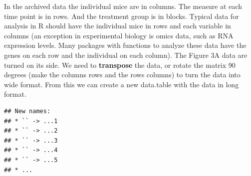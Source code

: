 \documentclass[]{book}
\newenvironment{Shaded}{\begin{snugshade}}{\end{snugshade}}
\newcommand{\DataTypeTok}[1]{\textcolor[rgb]{0.13,0.29,0.53}{#1}}
\newcommand{\KeywordTok}[1]{\textcolor[rgb]{0.13,0.29,0.53}{\textbf{#1}}}
\newcommand{\NormalTok}[1]{#1}
\newcommand{\OperatorTok}[1]{\textcolor[rgb]{0.81,0.36,0.00}{\textbf{#1}}}
\newcommand{\OtherTok}[1]{\textcolor[rgb]{0.56,0.35,0.01}{#1}}
\newcommand{\StringTok}[1]{\textcolor[rgb]{0.31,0.60,0.02}{#1}}
\begin{document}
In the archived data the individual mice are in columns. The measure at each time point is in rows. And the treatment group is in blocks. Typical data for analysis in R should have the individual mice in rows and each variable in columns (an exception in experimental biology is omics data, such as RNA expression levels. Many packages with functions to analyze these data have the genes on each row and the individual on each column). The Figure 3A data are turned on its side. We need to \textbf{transpose} the data, or rotate the matrix 90 degrees (make the columns rows and the rows columns) to turn the data into wide format. From this we can create a new data.table with the data in long format.

\begin{Shaded}
\end{Shaded}

\begin{verbatim}
## New names:
## * `` -> ...1
## * `` -> ...2
## * `` -> ...3
## * `` -> ...4
## * `` -> ...5
## * ...
\end{verbatim}
\end{document}
